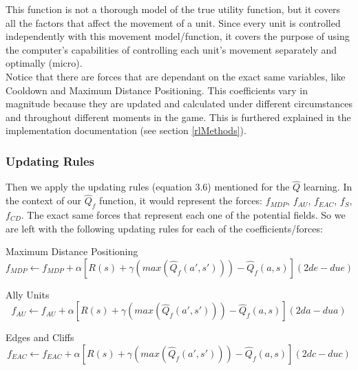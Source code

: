 This function is not a thorough model of the true utility function, but it covers all the factors that affect the movement of a unit. Since every unit is controlled independently with this movement model/function, it covers the purpose of using the computer's capabilities of controlling each unit's movement separately and optimally (micro).\\

Notice that there are forces that are dependant on the exact same variables, like Cooldown and Maximum Distance Positioning. This coefficients vary in magnitude because they are updated and calculated under different circumstances and throughout different moments in the game. This is furthered explained in the implementation documentation (see section \ref{rlMethods}). 

\subsubsection{Updating Rules}

Then we apply the updating rules (equation 3.6) mentioned for the $\hat{Q}$ learning. In the context of our  $\hat{Q}_f$ function, it would represent the forces: $f_{MDP}$, $f_{AU}$, $f_{EAC}$, $f_{S}$, $f_{CD}$. The exact same forces that represent each one of the potential fields. So we are left with the following updating rules for each of the coefficients/forces:

\label{rleq_update}
\begin{flushleft}
Maximum Distance Positioning 
\begin{equation}
f_{MDP}  \leftarrow f_{MDP}  + \alpha [ R(s) + \gamma (max(\hat{Q}_{f} (a',s')))-\hat{Q}_{f} (a,s) ](2de - due)
\end{equation}
\end{flushleft} 

\begin{flushleft}
Ally Units
\begin{equation}
f_{AU}  \leftarrow f_{AU} + \alpha [ R(s) + \gamma (max(\hat{Q}_{f} (a',s')))-\hat{Q}_{f} (a,s) ](2da - dua)
\end{equation}
\end{flushleft} 

\begin{flushleft}
Edges and Cliffs
\begin{equation}
f_{EAC}  \leftarrow f_{EAC}  + \alpha [ R(s) + \gamma (max(\hat{Q}_{f} (a',s')))-\hat{Q}_{f} (a,s) ] (2dc - duc)
\end{equation}
\end{flushleft} 

